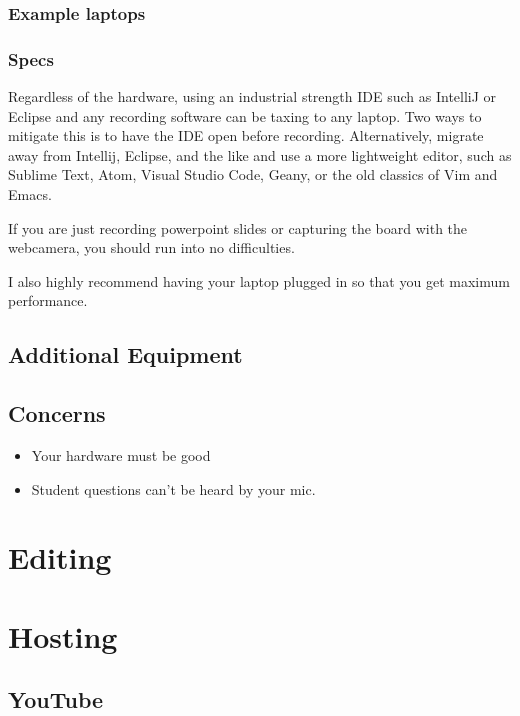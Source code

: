 \documentclass[sigconf]{acmart}
\begin{document}
\subsubsection{Example laptops}
\subsubsection{Specs}

Regardless of the hardware, using an industrial strength IDE such as IntelliJ or Eclipse and any recording software can be taxing to any laptop.
Two ways to mitigate this is to have the IDE open before recording.
Alternatively, migrate away from Intellij, Eclipse, and the like and use a more lightweight editor, such as Sublime Text, Atom, Visual Studio Code, Geany, or the old classics of Vim and Emacs.



If you are just recording powerpoint slides or capturing the board with the webcamera, you should run into no difficulties.

I also highly recommend having your laptop plugged in  so that you get maximum performance.

\subsection{Additional Equipment}



\subsection{Concerns}
\begin{itemize}
	\item Your hardware must be good
	\item Student questions can't be heard by your mic.
\end{itemize}

\section{Editing}

\section{Hosting}

\subsection{YouTube}
\end{document}
